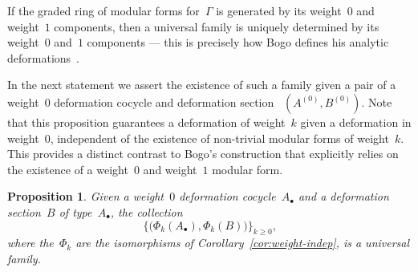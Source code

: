 \documentclass[JEP,XML,SOM,Unicode,published]{cedram}
\let\oldbullet\bullet
\renewcommand{\bullet}{{\scriptscriptstyle\oldbullet}}
\theoremstyle{plain}
\newtheorem{proposition}[theoremcounter]{Proposition}
\theoremstyle{definition}
\newcommand{\tx}{\text}
\let\Ga\Gamma
\begin{document}
If the graded ring of modular forms for~$\Ga$ is generated by its weight~$0$ and weight~$1$ components, then a universal family is uniquely determined by its weight~$0$ and~$1$ components --- this is precisely how Bogo defines his analytic deformations~\cite{bogo21}.

In the next statement we assert the existence of such a family given a pair of a weight~$0$ deformation cocycle and deformation section ~$(A^{(0)},B^{(0)})$. Note that this proposition guarantees a deformation of weight~$k$ given a deformation in weight~$0$, independent of the existence of non-trivial modular forms of weight~$k$. This provides a distinct contrast to Bogo's construction that explicitly relies on the existence of a weight~$0$ and weight~$1$ modular form.

\begin{proposition}\label{prop:universal_family}
Given a weight~$0$ deformation cocycle~$A_\bullet$ and a deformation section~$B$ of type~$A_\bullet$, the collection
\begin{equation*}
\big\{ \bigl(\Phi_k(A_\bullet),\Phi_k(B) \bigr) \big\}_{k\geq 0}
\tx{,}
\end{equation*}
where the~$\Phi_k$ are the isomorphisms of Corollary~\ref{cor:weight-indep}, is a universal family.
\end{proposition}
\end{document}
